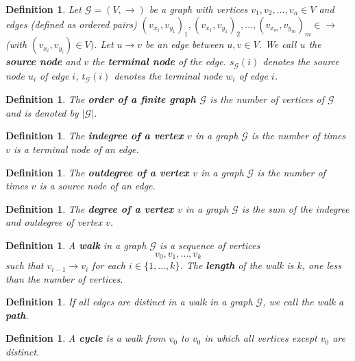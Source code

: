 \documentclass[a4paper,11pt]{report}
\newtheorem{definition}[theorem]{Definition}
\newcommand{\graf}{\mathscr{G}}
\begin{document}
 \begin{definition}\label{terminal}
  Let $\graf=(V,\to)$ be a graph with vertices $v_1, v_2, \ldots, v_n \in V$ 
  and edges (defined as ordered pairs) $(v_{x_1},v_{y_1})_1, (v_{x_1},v_{y_1})_2,\ldots, (v_{x_m},v_{y_m})_m  \in \to$ (with $(v_{x_i},v_{y_i})\in 
  V)$. Let $u \to v$ be an edge between $u, v \in V$. 
  We call $u$ the \textbf{source node} and $v$ the \textbf{terminal node} of the 
  edge. $s_\graf(i)$ denotes the source node $u_i$ of edge $i$, $t_\graf(i)$ denotes the 
  terminal node $w_i$ of edge $i$.
\end{definition}
 
\begin{definition}
  The \textbf{order of a finite graph $\graf$} is the number of vertices of $\graf$ and is denoted by $|\graf|$.  
\end{definition} 
  
  \begin{definition}
    The \textbf{indegree of a vertex $v$} in a graph $\graf$ is the number of times $v$ is a terminal node of an edge. 
    
  \end{definition}
    \begin{definition}
    The \textbf{outdegree of a vertex $v$} in a graph $\graf$ is the number of times $v$ is a source node of an edge. 
    
  \end{definition}
      \begin{definition}
    The \textbf{degree of a vertex $v$} in a graph $\graf$ is the sum of the indegree and outdegree of vertex $v$. 
    
  \end{definition}
  
  
 
 \begin{definition}
   A  \textbf{walk} in a graph $\graf$ is a sequence of vertices
   $$v_0,v_1,\ldots,v_k$$
   such that $v_{i-1} \to v_i$ for each $i \in \{1,\ldots,k\}$. The \textbf{length} of the walk is $k$, one less
   than the number of vertices. 
 \end{definition}
 
 \begin{definition}
   If all edges are distinct in a  walk in a graph $\graf$, we call the walk a \textbf{path}.
 \end{definition}
 
 \begin{definition}
   A \textbf{cycle} is a walk from $v_0$ to $v_0$ in which all vertices except $v_0$ are distinct. \end{definition}
  
\end{document}
